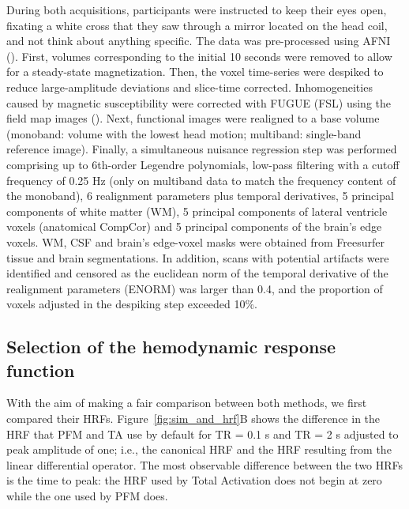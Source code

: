 During both acquisitions, participants were instructed to keep their eyes open, fixating a white cross that they saw through a mirror located on the head coil, and not think about anything specific. The data was pre-processed using AFNI (\citealt{Cox1996AFNISoftwareAnalysis}). First, volumes corresponding to the initial 10 seconds were removed to allow for a steady-state magnetization. Then, the voxel time-series were despiked to reduce large-amplitude deviations and slice-time corrected. Inhomogeneities caused by magnetic susceptibility were corrected with FUGUE (FSL) using the field map images (\citealt{Jenkinson2012FSL}). Next, functional images were realigned to a base volume (monoband: volume with the lowest head motion; multiband: single-band reference image). Finally, a simultaneous nuisance regression step was performed comprising up to 6th-order Legendre polynomials, low-pass filtering with a cutoff frequency of 0.25 Hz (only on multiband data to match the frequency content of the monoband), 6 realignment parameters plus temporal derivatives, 5 principal components of white matter (WM), 5 principal components of lateral ventricle voxels (anatomical CompCor) and 5 principal components of the brain's edge voxels. WM, CSF and brain's edge-voxel masks were obtained from Freesurfer tissue and brain segmentations. In addition, scans with potential artifacts were identified and censored as the euclidean norm of the temporal derivative of the realignment parameters (ENORM) was larger than 0.4, and the proportion of voxels adjusted in the despiking step exceeded 10\%.

\subsection{Selection of the hemodynamic response function}

With the aim of making a fair comparison between both methods, we first compared their HRFs. Figure~\ref{fig:sim_and_hrf}B shows the difference in the HRF that PFM and TA use by default for TR = 0.1 s and TR = 2 s adjusted to peak amplitude of one; i.e., the canonical HRF and the HRF resulting from the linear differential operator. The most observable difference between the two HRFs is the time to peak: the HRF used by Total Activation does not begin at zero while the one used by PFM does.

